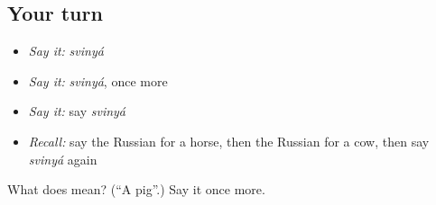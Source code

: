\subsection*{Your turn}
\begin{itemize}
\raggedright
  \item \emph{Say it:} \emph{svinyá}
  \item \emph{Say it:} \emph{svinyá}, once more
  \item \emph{Say it:} say \emph{svinyá}
  \item \emph{Recall:} say the Russian for a horse, then the Russian for a cow, then say \emph{svinyá} again
\end{itemize}

\begin{tcolorbox}[breakable,colback=teal!4,colframe=teal!35!black,title={Before you move on}]
What does  mean? (\textquotedblleft{}A pig\textquotedblright{}.) Say it once more.
\end{tcolorbox}
